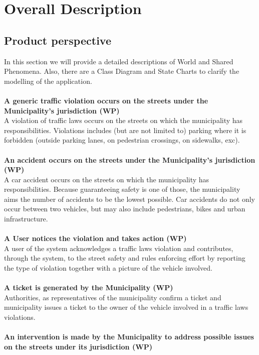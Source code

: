 \documentclass {article}
\begin{document}
\pagebreak	
	
\section{Overall Description}
	\subsection{Product perspective} 
	In this section we will provide a detailed descriptions of World and Shared Phenomena. Also, there are a Class Diagram and State Charts to clarify the modelling of the application. \\ \\
	{\bf A generic traffic violation occurs on the streets under the \mbox{Municipality's} jurisdiction (WP)} \\
		A violation of traffic laws occurs on the streets on which the municipality has responsibilities.
Violations includes (but are not limited to) parking where it is forbidden (outside parking lanes, on pedestrian crossings, on sidewalks, exc). \\ \\
	{\bf An accident occurs on the streets under the Municipality's jurisdiction (WP)} \\
		A car accident occurs on the streets on which the municipality has responsibilities. Because guaranteeing safety is one of those, the municipality aims the number of accidents to be the lowest possible. Car accidents do not only occur between two vehicles, but may also include pedestrians, bikes and urban infrastructure. \\ \\
	{\bf A User notices the violation and takes action (WP)} \\
		A user of the system acknowledges a traffic laws violation and contributes, through the system, to the street safety and rules enforcing effort by reporting the type of violation together with a picture of the vehicle involved. \\ \\
	{\bf A ticket is generated by the Municipality (WP)}\\
		Authorities, as representatives of the municipality confirm a ticket and municipality issues a ticket to the owner of the vehicle involved in a traffic laws violations. \\ \\
	{\bf An intervention is made by the Municipality to address possible issues on the streets under its jurisdiction (WP)} \\
\end{document}
